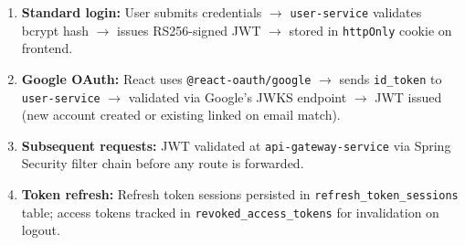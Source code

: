 \documentclass[12pt,a4paper]{report}
\begin{document}
\begin{enumerate}[leftmargin=1.5em]
  \item \textbf{Standard login:} User submits credentials $\rightarrow$ \texttt{user-service} validates bcrypt hash $\rightarrow$ issues RS256-signed JWT $\rightarrow$ stored in \texttt{httpOnly} cookie on frontend.
  \item \textbf{Google OAuth:} React uses \texttt{@react-oauth/google} $\rightarrow$ sends \texttt{id\_token} to \texttt{user-service} $\rightarrow$ validated via Google's JWKS endpoint $\rightarrow$ JWT issued (new account created or existing linked on email match).
  \item \textbf{Subsequent requests:} JWT validated at \texttt{api-gateway-service} via Spring Security filter chain before any route is forwarded.
  \item \textbf{Token refresh:} Refresh token sessions persisted in \texttt{refresh\_token\_sessions} table; access tokens tracked in \texttt{revoked\_access\_tokens} for invalidation on logout.
\end{enumerate}
\end{document}
